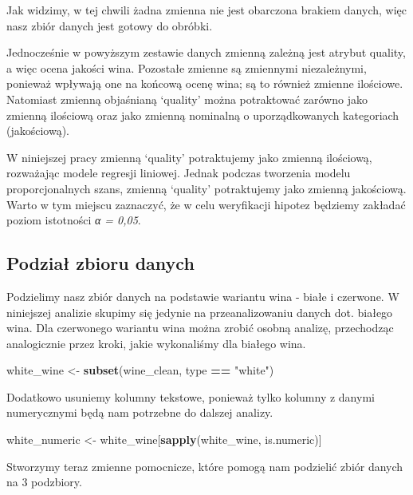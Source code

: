 \documentclass[
]{article}
\newenvironment{Shaded}{\begin{snugshade}}{\end{snugshade}}
\newcommand{\FunctionTok}[1]{\textcolor[rgb]{0.13,0.29,0.53}{\textbf{#1}}}
\newcommand{\NormalTok}[1]{#1}
\newcommand{\OtherTok}[1]{\textcolor[rgb]{0.56,0.35,0.01}{#1}}
\newcommand{\SpecialCharTok}[1]{\textcolor[rgb]{0.81,0.36,0.00}{\textbf{#1}}}
\newcommand{\StringTok}[1]{\textcolor[rgb]{0.31,0.60,0.02}{#1}}
\begin{document}
Jak widzimy, w tej chwili żadna zmienna nie jest obarczona brakiem
danych, więc nasz zbiór danych jest gotowy do obróbki.

Jednocześnie w powyższym zestawie danych zmienną zależną jest atrybut
quality, a więc ocena jakości wina. Pozostałe zmienne są zmiennymi
niezależnymi, ponieważ wpływają one na końcową ocenę wina; są to również
zmienne ilościowe. Natomiast zmienną objaśnianą `quality' można
potraktować zarówno jako zmienną ilościową oraz jako zmienną nominalną o
uporządkowanych kategoriach (jakościową).

W niniejszej pracy zmienną `quality' potraktujemy jako zmienną
ilościową, rozważając modele regresji liniowej. Jednak podczas tworzenia
modelu proporcjonalnych szans, zmienną `quality' potraktujemy jako
zmienną jakościową. Warto w tym miejscu zaznaczyć, że w celu weryfikacji
hipotez będziemy zakładać poziom istotności \emph{α = 0,05}.

\subsection{Podział zbioru danych}\label{podziaux142-zbioru-danych}

Podzielimy nasz zbiór danych na podstawie wariantu wina - białe i
czerwone. W niniejszej analizie skupimy się jedynie na przeanalizowaniu
danych dot. białego wina. Dla czerwonego wariantu wina można zrobić
osobną analizę, przechodząc analogicznie przez kroki, jakie wykonaliśmy
dla białego wina.

\begin{Shaded}
\begin{Highlighting}[]
\NormalTok{white\_wine }\OtherTok{\textless{}{-}} \FunctionTok{subset}\NormalTok{(wine\_clean, type }\SpecialCharTok{==} \StringTok{"white"}\NormalTok{)}
\end{Highlighting}
\end{Shaded}

Dodatkowo usuniemy kolumny tekstowe, ponieważ tylko kolumny z danymi
numerycznymi będą nam potrzebne do dalszej analizy.

\begin{Shaded}
\begin{Highlighting}[]
\NormalTok{white\_numeric }\OtherTok{\textless{}{-}}\NormalTok{ white\_wine[}\FunctionTok{sapply}\NormalTok{(white\_wine, is.numeric)]}
\end{Highlighting}
\end{Shaded}

Stworzymy teraz zmienne pomocnicze, które pomogą nam podzielić zbiór
danych na 3 podzbiory.
\end{document}

